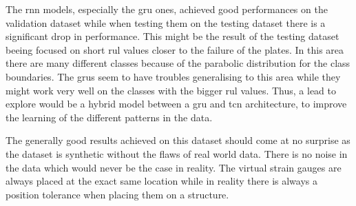 \documentclass[conference]{IEEEtran}
\begin{document}
The \gls{rnn} models, especially the \gls{gru} ones, achieved good performances on the validation dataset while when testing them on the testing dataset there is a significant drop in performance. This might be the result of the testing dataset beeing focused on short \gls{rul} values closer to the failure of the plates. In this area there are many different classes because of the parabolic distribution for the class boundaries. The \glspl{gru} seem to have troubles generalising to this area while they might work very well on the classes with the bigger \gls{rul} values. Thus, a lead to explore would be a hybrid model between a \gls{gru} and \gls{tcn} architecture, to improve the learning of the different patterns in the data.

The generally good results achieved on this dataset should come at no surprise as the dataset is synthetic without the flaws of real world data. There is no noise in the data which would never be the case in reality. The virtual strain gauges are always placed at the exact same location while in reality there is always a position tolerance when placing them on a structure.








\newpage
\printbibliography
\end{document}

